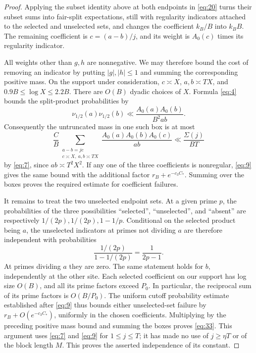 \begin{proof}
Applying the subset identity above at both endpoints in \eqref{eq:20}
turns their subset sums into fair-split expectations, still with regularity
indicators attached to the selected and unselected sets, and changes the
coefficient \(k_B/B\) into \(k_BB\).  The remaining coefficient is
\(c=(a-b)/j\), and its weight is \(A_0(c)\) times its regularity
indicator.

All weights other than \(g,h\) are nonnegative.  We may therefore
bound the cost of removing an indicator by putting
\(\lvert g\rvert,\lvert h\rvert\le1\) and summing the corresponding
positive mass.  On the support under consideration,
\(c\asymp X\), \(a,b\asymp TX\), and
\(0.9B\le\log X\le2.2B\).  There are \(O(B)\) dyadic choices of
\(X\).  Formula \eqref{eq:4} bounds the split-product probabilities by
\[
 \nu_{1/2}(a)\nu_{1/2}(b)
 \ll \frac{A_0(a)A_0(b)}{B^2ab}.
\]
Consequently the untruncated mass in one such box is at most
\[
 \frac{C}{B}
 \sum_{\substack{a-b=jc\\c\asymp X,\ a,b\asymp TX}}
       \frac{A_0(a)A_0(b)A_0(c)}{ab}
 \ll \frac{\Sigma(j)}{BT}
\]
by \eqref{eq:7}, since \(ab\asymp T^2X^2\).  If any one of the three
coefficients is nonregular, \eqref{eq:9} gives the same bound with the
additional factor \(r_B+e^{-c_3C_*}\).  Summing over the boxes proves
the required estimate for coefficient failures.

It remains to treat the two unselected endpoint sets.  At a given
prime \(p\), the probabilities of the three possibilities ``selected'',
``unselected'', and ``absent'' are respectively
\(1/(2p),1/(2p),1-1/p\).  Conditional on the selected product being
\(a\), the unselected indicators at primes not dividing \(a\) are
therefore independent with probabilities
\[
 \frac{1/(2p)}{1-1/(2p)}=\frac1{2p-1}.
\]
At primes dividing \(a\) they are zero.  The same statement holds for
\(b\), independently at the other site.  Each selected coefficient on
our support has log size \(O(B)\), and all its prime factors exceed
\(P_0\).  In particular, the reciprocal sum of its prime factors is
\(O(B/P_0)\).  The uniform cutoff probability estimate established
after \eqref{eq:9} thus bounds either unselected-set failure by
\(r_B+O(e^{-c_3C_*})\), uniformly in the chosen coefficients.  Multiplying
by the preceding positive mass bound and summing the boxes proves
\eqref{eq:33}.  This argument uses \eqref{eq:7} and \eqref{eq:9} for
\(1\le j\le T\); it has made no use of \(j\ge\eta T\) or of the block
length \(M\).  This proves the asserted independence of its constant.


\end{proof}
